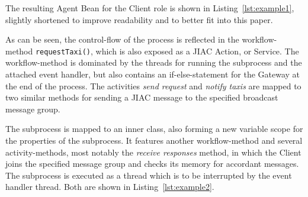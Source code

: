 The resulting Agent Bean for the Client role is shown in Listing~\ref{lst:example1},
slightly shortened to improve readability and to better fit into this paper.



As can be seen, the control-flow of the process is reflected in the workflow-method
\verb_requestTaxi()_, which is also exposed as a JIAC Action, or Service.  The
workflow-method is dominated by the threads for running the subprocess and the
attached event handler, but also contains an if-else-statement for the Gateway
at the end of the process.  The activities \emph{send request} and \emph{notify
taxis} are mapped to two similar methods for sending a JIAC message to the
specified broadcast message group.

The subprocess is mapped to an inner class, also forming a new variable scope for
the properties of the subprocess.  It features another workflow-method and several
activity-methods, most notably the \emph{receive responses} method, in which the
Client joins the specified message group and checks its memory for accordant
messages.  The subprocess is executed as a thread which is to be interrupted by
the event handler thread.  Both are shown in Listing~\ref{lst:example2}.



